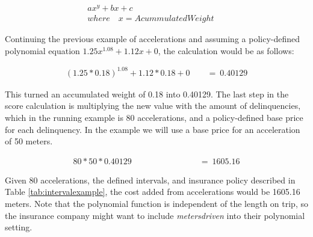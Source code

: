 \begin{align*}
ax^{y} + bx + c\quad \quad \quad \quad \quad \quad \quad \quad \quad \quad \quad \\
where\quad x = AcummulatedWeight
\end{align*}

Continuing the previous example of accelerations and assuming a policy-defined polynomial equation $1.25x^{1.08} +  1.12x + 0$, the calculation would be as follows:

\begin{align*}
(1.25 * 0.18)^{1.08} +  1.12 * 0.18 + 0\quad \quad  =\ 0.40129
\end{align*}

This turned an accumulated weight of 0.18 into 0.40129. The last step in the score calculation is multiplying the new value with the amount of delinquencies, which in the running example is 80 accelerations, and a policy-defined base price for each delinquency. In the example we will use a base price for an acceleration of 50 meters.

\begin{align*}
80 * 50 * 0.40129\quad \quad \quad \quad \quad \quad \quad \quad =\ 1605.16
\end{align*}


Given 80 accelerations, the defined intervals, and insurance policy described in Table \ref{tab:intervalexample}, the cost added from accelerations would be 1605.16 meters. Note that the polynomial function is independent of the length on trip, so the insurance company might want to include \textit{metersdriven} into their polynomial setting.